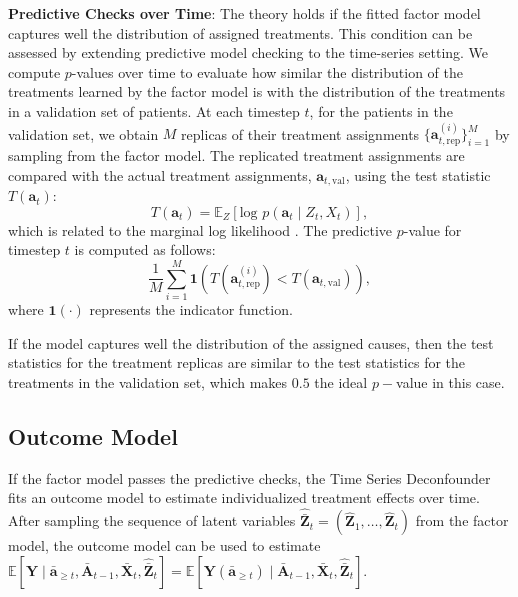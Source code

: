 \documentclass{article}
\newcommand{\vc}[1]{\mathbf{#1}}
\newcommand{\bb}[1]{\mathbb{#1}}
\newcommand{\hist}[1]{\bar{\vc{#1}}}
\begin{document}
	

	\textbf{Predictive Checks over Time}: The theory holds if the fitted factor model captures well the distribution of assigned treatments. This condition can be assessed by extending predictive model checking \cite{rubin1984bayesianly}  to the time-series setting. We compute $p$-values over time to evaluate how similar the distribution of the treatments learned by the factor model is with the distribution of the treatments in a validation set of patients. 	At each timestep $t$, for the patients in the validation set, we obtain $M$ replicas of their treatment assignments $\{\vc{a}_{t, \text{rep}}^{(i)}\}_{i=1}^{M}$ by sampling from the factor model.  The replicated treatment assignments are compared with the actual treatment assignments, $\vc{a}_{t, \text{val}}$, using the test statistic $T(\vc{a}_t)$:
	\begin{equation}
	T(\vc{a}_t) = \bb{E}_Z[\text{log}\,\, p(\vc{a}_t \mid Z_t, X_t)],
	\end{equation}
	which is related to the marginal log likelihood \cite{wang2018blessings}. The predictive $p$-value for timestep $t$ is computed as follows: 
	\begin{equation}
	\dfrac{1}{M} \sum_{i=1}^{M} \mathbf{1} \left(T\left(\vc{a}_{t, \text{rep}}^{(i)}\right) < T\left(\vc{a}_{t, \text{val}}\right)\right),
	\end{equation}
	where $\mathbf{1}(\cdot)$ represents the indicator function. 
	
	If the model captures well the distribution of the assigned causes, then the test statistics for the treatment replicas are similar to the test statistics for the treatments in the validation set, which makes $0.5$ the ideal $p-$value in this case.  
	

	
	\subsection{Outcome Model} \label{sec:outcome_model}
	
	If the factor model passes the predictive checks, the Time Series Deconfounder fits an outcome model \citep{robins2000marginal, lim2018forecasting}  to estimate individualized treatment effects over time. After sampling the sequence of latent variables $\hat{\hist{Z}}_t = (\hat{\vc{Z}}_1, \dots, \hat{\vc{Z}}_t)$ from the factor model, the outcome model can be used to estimate $\mathbb{E} [\vc{Y} \mid \hist{a}_{\geq t}, \hist{A}_{t-1}, \hist{X}_t, \hat{\hist{Z}}_t] = \mathbb{E} [\vc{Y}(\hist{a}_{\geq t}) \mid  \hist{A}_{t-1}, \hist{X}_t,  \hat{\hist{Z}}_t]$. 
\end{document}
